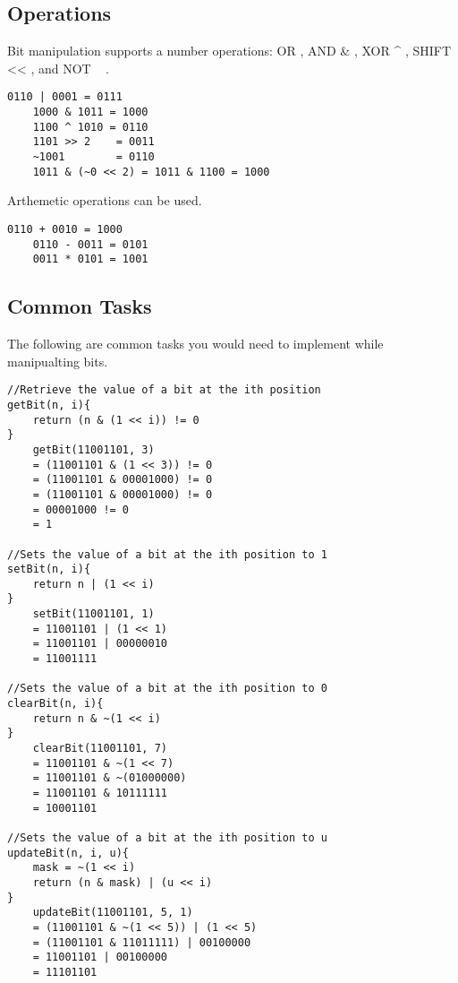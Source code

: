 \documentclass{article}
\begin{document}
	\subsection{Operations}
		Bit manipulation supports a number operations: OR \text{\textbar}, AND \& , XOR \string^ , SHIFT << , and NOT \string~ .
		\begin{lstlisting}[style=pseudo]
	0110 | 0001 = 0111
	1000 & 1011 = 1000
	1100 ^ 1010 = 0110
	1101 >> 2    = 0011
	~1001        = 0110
	1011 & (~0 << 2) = 1011 & 1100 = 1000
		\end{lstlisting}
		Arthemetic operations can be used.
	\begin{lstlisting}[style=pseudo]
	0110 + 0010 = 1000
	0110 - 0011 = 0101
	0011 * 0101 = 1001
	\end{lstlisting}

	\subsection{Common Tasks}
	The following are common tasks you would need to implement while manipualting bits.
	\begin{lstlisting}[style=pseudo]
//Retrieve the value of a bit at the ith position
getBit(n, i){
	return (n & (1 << i)) != 0
}
	getBit(11001101, 3)
	= (11001101 & (1 << 3)) != 0
	= (11001101 & 00001000) != 0
	= (11001101 & 00001000) != 0
	= 00001000 != 0
	= 1

//Sets the value of a bit at the ith position to 1
setBit(n, i){
	return n | (1 << i)
}
	setBit(11001101, 1)
	= 11001101 | (1 << 1)
	= 11001101 | 00000010
	= 11001111

//Sets the value of a bit at the ith position to 0
clearBit(n, i){
	return n & ~(1 << i)
}
	clearBit(11001101, 7)
	= 11001101 & ~(1 << 7)
	= 11001101 & ~(01000000)
	= 11001101 & 10111111
	= 10001101

//Sets the value of a bit at the ith position to u
updateBit(n, i, u){
	mask = ~(1 << i)
	return (n & mask) | (u << i)
}
	updateBit(11001101, 5, 1)
	= (11001101 & ~(1 << 5)) | (1 << 5)
	= (11001101 & 11011111) | 00100000
	= 11001101 | 00100000
	= 11101101
	\end{lstlisting}
\end{document}
